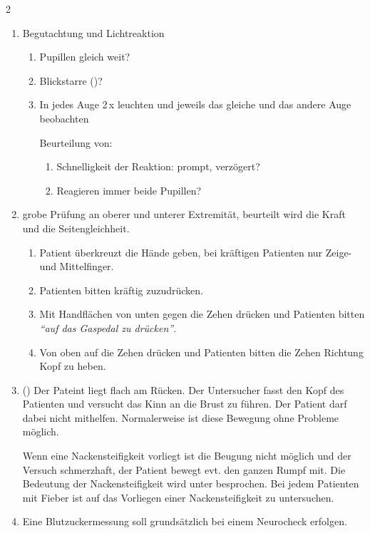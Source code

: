 \begin{multicols}{2}

\begin{enumerate}
  \item {} Begutachtung und Lichtreaktion
\begin{enumerate}
  \item Pupillen gleich weit?
  \item Blickstarre ()? 
  \item {} In jedes Auge 2\,x leuchten und
  jeweils das gleiche und das andere Auge beobachten
  
  Beurteilung von:
  \begin{enumerate}
  \item Schnelligkeit der Reaktion: prompt, verzögert?
  \item Reagieren immer beide
  Pupillen?
    \end{enumerate}
\end{enumerate}
  \item {} grobe Prüfung an oberer und
  unterer Extremität, beurteilt wird die Kraft und die
  Seitengleichheit. 
    \begin{enumerate}
  \item Patient überkreuzt die Hände geben, bei kräftigen
  Patienten nur Zeige- und Mittelfinger.
  \item Patienten bitten kräftig zuzudrücken.
  \item Mit Handflächen von unten gegen die Zehen drücken
  und Patienten bitten \emph{"`auf das Gaspedal zu
  drücken"'}.
  \item Von oben auf die Zehen drücken und Patienten bitten
  die Zehen Richtung Kopf zu heben.
\end{enumerate}
  \item {} () Der
  Pateint liegt flach am Rücken. Der Untersucher fasst den
  Kopf des Patienten und versucht das Kinn an die Brust zu
  führen. Der Patient darf dabei nicht mithelfen.
  Normalerweise ist diese Bewegung ohne Probleme möglich.
  
  Wenn eine Nackensteifigkeit vorliegt ist die Beugung nicht
  möglich und der Versuch schmerzhaft, der Patient bewegt
  evt. den ganzen Rumpf mit. Die Bedeutung der
  Nackensteifigkeit wird unter 
  besprochen. Bei jedem Patienten mit Fieber ist auf das
  Vorliegen einer Nackensteifigkeit zu untersuchen.  
  \item {} Eine Blutzuckermessung soll
  grundsätzlich bei einem Neurocheck erfolgen.
\end{enumerate}

\end{multicols}

